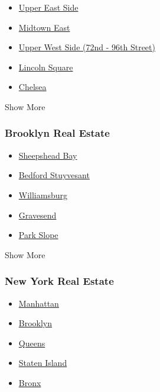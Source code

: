 \begin{itemize}
\tightlist
\item
  \href{/real-estate/usa/ny/new-york/upper-east-side/homes-for-sale}{Upper
  East Side}
\item
  \href{/real-estate/usa/ny/new-york/midtown-east/homes-for-sale}{Midtown
  East}
\item
  \href{/real-estate/usa/ny/new-york/upper-west-side-(72nd-96th-street)/homes-for-sale}{Upper
  West Side (72nd - 96th Street)}
\item
  \href{/real-estate/usa/ny/new-york/lincoln-square/homes-for-sale}{Lincoln
  Square}
\item
  \href{/real-estate/usa/ny/new-york/chelsea/homes-for-sale}{Chelsea}
\end{itemize}

Show More

\hypertarget{brooklyn-real-estate}{%
\subsubsection{Brooklyn Real Estate}\label{brooklyn-real-estate}}

\begin{itemize}
\tightlist
\item
  \href{/real-estate/usa/ny/brooklyn/sheepshead-bay/homes-for-sale}{Sheepshead
  Bay}
\item
  \href{/real-estate/usa/ny/brooklyn/bedford-stuyvesant/homes-for-sale}{Bedford
  Stuyvesant}
\item
  \href{/real-estate/usa/ny/brooklyn/williamsburg/homes-for-sale}{Williamsburg}
\item
  \href{/real-estate/usa/ny/brooklyn/gravesend/homes-for-sale}{Gravesend}
\item
  \href{/real-estate/usa/ny/brooklyn/park-slope/homes-for-sale}{Park
  Slope}
\end{itemize}

Show More

\hypertarget{new-york-real-estate}{%
\subsubsection{New York Real Estate}\label{new-york-real-estate}}

\begin{itemize}
\tightlist
\item
  \href{/real-estate/usa/ny/new-yorknew-york-ny-usa/homes-for-sale}{Manhattan}
\item
  \href{/real-estate/usa/ny/brooklynbrooklyn-ny-usa/homes-for-sale}{Brooklyn}
\item
  \href{/real-estate/usa/ny/queensqueens-ny-usa/homes-for-sale}{Queens}
\item
  \href{/real-estate/usa/ny/staten-islandstaten-island-ny-usa/homes-for-sale}{Staten
  Island}
\item
  \href{/real-estate/usa/ny/bronxbronx-ny-usa/homes-for-sale}{Bronx}
\end{itemize}

